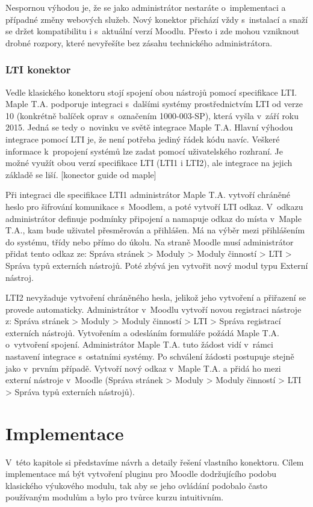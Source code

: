 \documentclass[
print,
  11pt,
  table,   
  nolof,    
  nolot,
  oneside,
  draft
]{fithesis3}
\begin{document}
Nespornou výhodou je, že se jako administrátor nestaráte o~implementaci a případné změny webových služeb. Nový konektor přichází vždy s~instalací a snaží se držet kompatibilitu i s~aktuální verzí Moodlu. Přesto i zde mohou vzniknout drobné rozpory, které nevyřešíte bez zásahu technického administrátora.

		\subsection{LTI konektor}
Vedle klasického konektoru stojí spojení obou nástrojů pomocí specifikace LTI. Maple T.A. podporuje integraci s~dalšími systémy prostřednictvím LTI od verze 10 (konkrétně balíček oprav s~označením 1000-003-SP), která vyšla v~září roku 2015. Jedná se tedy o~novinku ve světě integrace Maple T.A. Hlavní výhodou integrace pomocí LTI je, že není potřeba jediný řádek kódu navíc. Veškeré informace k~propojení systémů lze zadat pomocí uživatelského rozhraní. Je možné využít obou verzí specifikace LTI (LTI1 i LTI2), ale integrace na jejich základě se liší. [konector guide od maple]

Při integraci dle specifikace LTI1 administrátor Maple T.A. vytvoří chráněné heslo pro šifrování komunikace s~Moodlem, a poté vytvoří LTI odkaz. V~odkazu administrátor definuje podmínky připojení a namapuje odkaz do místa v~Maple T.A., kam bude uživatel přesměrován a přihlášen. Má na výběr mezi přihlášením do systému, třídy nebo přímo do úkolu. Na straně Moodle musí administrátor přidat tento odkaz ze: Správa stránek > Moduly > Moduly činností > LTI > Správa typů externích nástrojů. Poté zbývá jen vytvořit nový modul typu Externí nástroj.


LTI2 nevyžaduje vytvoření chráněného hesla, jelikož jeho vytvoření a přiřazení se provede automaticky. Administrátor v~Moodlu vytvoří novou registraci nástroje z: Správa stránek > Moduly > Moduly činností > LTI > Správa registrací externích nástrojů. Vytvořením a odesláním formuláře požádá Maple T.A. o~vytvoření spojení. Administrátor Maple T.A. tuto žádost vidí v~rámci nastavení integrace s~ostatními systémy. Po schválení žádosti postupuje stejně jako v~prvním případě. Vytvoří nový odkaz v~Maple T.A. a přidá ho mezi externí nástroje v~Moodle (Správa stránek > Moduly > Moduly činností > LTI > Správa typů externích nástrojů).

\chapter{Implementace}
V~této kapitole si představíme návrh a detaily řešení vlastního konektoru. Cílem implementace má být vytvoření pluginu pro Moodle dodržujícího podobu klasického výukového modulu, tak aby se jeho ovládání podobalo často používaným modulům a bylo pro tvůrce kurzu intuitivním.
\end{document}
